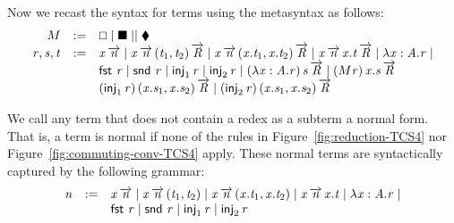 Now we recast the syntax for terms using the metasyntax as follows:
\[
\begin{array}{rll}
  M & := &  \oblong  \mid  \blacksquare  \mid  \relax  \mid  \mathbin{\blacklozenge} \\
  \mathit{r},\mathit{s},\mathit{t} & := & \mathit{x} \,  \overrightarrow{ \mathit{n} }  \mid \mathit{x} \,   \overrightarrow{ \mathit{n} }   \, (  \mathit{t_{{\mathrm{1}}}}  ,  \mathit{t_{{\mathrm{2}}}}  ) \,  \overrightarrow{ \mathit{R} }  \mid \mathit{x} \,   \overrightarrow{ \mathit{n} }   \,  ( \mathit{x} . \mathit{t_{{\mathrm{1}}}} , \mathit{x} . \mathit{t_{{\mathrm{2}}}} )  \,  \overrightarrow{ \mathit{R} } 
  \mid  \mathit{x} \,   \overrightarrow{ \mathit{n} }   \,  \mathit{x} . \mathit{t}   \,  \overrightarrow{ \mathit{R} }  \mid  \lambda  \mathit{x}  :  \mathit{A} . \mathit{r}  \mid \\
  & & \mathsf{fst}\, \, \mathit{r} \mid \mathsf{snd}\, \, \mathit{r} \mid \mathsf{inj}_1\,  \mathit{r} \mid \mathsf{inj}_2\,  \mathit{r} \mid (   \lambda  \mathit{x}  :  \mathit{A} . \mathit{r}   ) \, \mathit{s} \,  \overrightarrow{ \mathit{R} }  \mid  (   \mathbin{M}  \mathit{r}   ) \,  \mathit{x} . \mathit{s}   \,  \overrightarrow{ \mathit{R} } \\
  & & (  \mathsf{inj}_1\,  \mathit{r}  ) \,  ( \mathit{x} . \mathit{s_{{\mathrm{1}}}} , \mathit{x} . \mathit{s_{{\mathrm{2}}}} )  \,  \overrightarrow{ \mathit{R} }  \mid (  \mathsf{inj}_2\,  \mathit{r}  ) \,  ( \mathit{x} . \mathit{s_{{\mathrm{1}}}} , \mathit{x} . \mathit{s_{{\mathrm{2}}}} )  \,  \overrightarrow{ \mathit{R} } 
\end{array}
\]

We call any term that does not contain a redex as a subterm a normal
form.  That is, a term is normal if none of the rules in
Figure~\ref{fig:reduction-TCS4} nor
Figure~\ref{fig:commuting-conv-TCS4} apply.  These normal terms are
syntactically captured by the following grammar:
\[
\begin{array}{rll}
  \mathit{n} & := & \mathit{x} \,  \overrightarrow{ \mathit{n} }  \mid \mathit{x} \,   \overrightarrow{ \mathit{n} }   \, (  \mathit{t_{{\mathrm{1}}}}  ,  \mathit{t_{{\mathrm{2}}}}  ) \mid \mathit{x} \,   \overrightarrow{ \mathit{n} }   \,  ( \mathit{x} . \mathit{t_{{\mathrm{1}}}} , \mathit{x} . \mathit{t_{{\mathrm{2}}}} ) 
  \mid \mathit{x} \,   \overrightarrow{ \mathit{n} }   \,  \mathit{x} . \mathit{t}  \mid  \lambda  \mathit{x}  :  \mathit{A} . \mathit{r}  \mid \\
  & & \mathsf{fst}\, \, \mathit{r} \mid \mathsf{snd}\, \, \mathit{r} \mid \mathsf{inj}_1\,  \mathit{r} \mid \mathsf{inj}_2\,  \mathit{r}
\end{array}
\]

